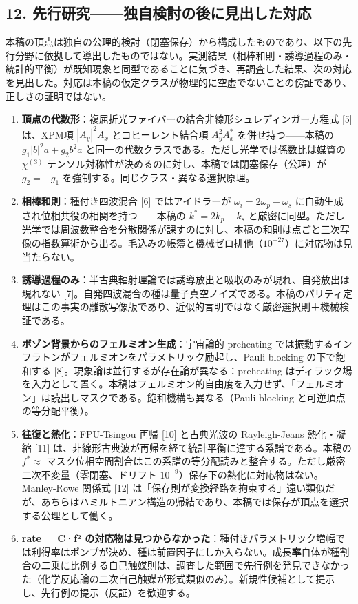 \documentclass[
  a4paper,
]{ltjsarticle}
\providecommand{\tightlist}{%
  \setlength{\itemsep}{0pt}\setlength{\parskip}{0pt}}
\begin{document}
\subsection{12.
先行研究------独自検討の後に見出した対応}\label{ux5148ux884cux7814ux7a76ux72ecux81eaux691cux8a0eux306eux5f8cux306bux898bux51faux3057ux305fux5bfeux5fdc}

本稿の頂点は独自の公理的検討（閉塞保存）から構成したものであり、以下の先行分野に依拠して導出したものではない。実測結果（相棒和則・誘導過程のみ・統計的平衡）が既知現象と同型であることに気づき、再調査した結果、次の対応を見出した。対応は本稿の仮定クラスが物理的に空虚でないことの傍証であり、正しさの証明ではない。

\begin{enumerate}
\def\labelenumi{\arabic{enumi}.}
\tightlist
\item
  \textbf{頂点の代数形}：複屈折光ファイバーの結合非線形シュレディンガー方程式
  {[}5{]} は、XPM項 \(|A_y|^2A_x\) とコヒーレント結合項 \(A_y^2 A_x^*\)
  を併せ持つ------本稿の \(g_1|b|^2a + g_2 b^2\bar a\)
  と同一の代数クラスである。ただし光学では係数比は媒質の \(\chi^{(3)}\)
  テンソル対称性が決めるのに対し、本稿では閉塞保存（公理）が
  \(g_2=-g_1\) を強制する。同じクラス・異なる選択原理。
\item
  \textbf{相棒和則}：種付き四波混合 {[}6{]} ではアイドラーが
  \(\omega_i = 2\omega_p - \omega_s\)
  に自動生成され位相共役の相関を持つ------本稿の \(k^* = 2k_p - k_s\)
  と厳密に同型。ただし光学では周波数整合を分散関係が課すのに対し、本稿の和則は点ごと三次写像の指数算術から出る。毛込みの帳簿と機械ゼロ排他（\(10^{-27}\)）に対応物は見当たらない。
\item
  \textbf{誘導過程のみ}：半古典輻射理論では誘導放出と吸収のみが現れ、自発放出は現れない
  {[}7{]}。自発四波混合の種は量子真空ノイズである。本稿のパリティ定理はこの事実の離散写像版であり、近似的言明ではなく厳密選択則＋機械検証である。
\item
  \textbf{ボゾン背景からのフェルミオン生成}：宇宙論的 preheating
  では振動するインフラトンがフェルミオンをパラメトリック励起し、Pauli
  blocking の下で飽和する
  {[}8{]}。現象論は並行するが存在論が異なる：preheating
  はディラック場を入力として置く。本稿はフェルミオン的自由度を入力せず、「フェルミオン」は読出しマスクである。飽和機構も異なる（Pauli
  blocking と可逆頂点の等分配平衡）。
\item
  \textbf{往復と熱化}：FPU-Tsingou 再帰 {[}10{]} と古典光波の
  Rayleigh-Jeans 熱化・凝縮 {[}11{]}
  は、非線形古典波が再帰を経て統計平衡に達する系譜である。本稿の
  \(f^*\approx\)
  マスク位相空間割合はこの系譜の等分配読みと整合する。ただし厳密二次不変量（零閉塞、ドリフト
  \(10^{-9}\)）保存下の熱化に対応物はない。Manley-Rowe 関係式 {[}12{]}
  は「保存則が変換経路を拘束する」遠い類似だが、あちらはハミルトニアン構造の帰結であり、本稿では保存が頂点を選択する公理として働く。
\item
  \textbf{rate = C·f²
  の対応物は見つからなかった}：種付きパラメトリック増幅では利得率はポンプが決め、種は前置因子にしか入らない。成長\textbf{率}自体が種割合の二乗に比例する自己触媒則は、調査した範囲で先行例を発見できなかった（化学反応論の二次自己触媒が形式類似のみ）。新規性候補として提示し、先行例の提示（反証）を歓迎する。
\end{enumerate}
\end{document}
